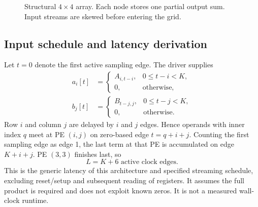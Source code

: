 \documentclass[10pt,twocolumn,letterpaper]{article}
\begin{document}
\begin{figure}[t]\centering
{}
\caption{Structural $4\times4$ array. Each node stores one partial output sum. Input streams are skewed before entering the grid.}\label{fig:array}
\end{figure}

\subsection{Input schedule and latency derivation}
Let $t=0$ denote the first active sampling edge. The driver supplies
\begin{align}
a_i[t]&=\begin{cases}A_{i,t-i},&0\leq t-i<K,\\0,&\text{otherwise},\end{cases}\\
b_j[t]&=\begin{cases}B_{t-j,j},&0\leq t-j<K,\\0,&\text{otherwise}.\end{cases}
\end{align}
Row $i$ and column $j$ are delayed by $i$ and $j$ edges. Hence operands with
inner index $q$ meet at PE $(i,j)$ on zero-based edge $t=q+i+j$.
Counting the first sampling edge as edge 1, the last term at that PE is
accumulated on edge $K+i+j$. PE $(3,3)$ finishes last, so
\begin{equation}\boxed{L=K+6\text{ active clock edges}.}\label{eq:latency}\end{equation}
This is the generic latency of this architecture and specified streaming
schedule, excluding reset/setup and subsequent reading of registers.
It assumes the full product is required and does not exploit known zeros.
It is not a measured wall-clock runtime.
\end{document}
